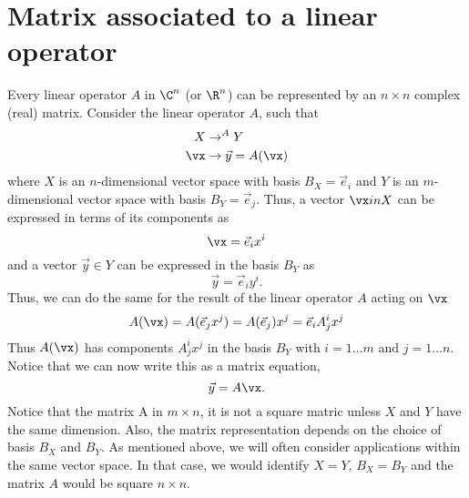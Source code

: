 \documentclass[cplx.tex]{subfiles}
\begin{document}
\section{Matrix associated to a linear operator}
Every linear operator $A$ in $\C^n$ (or $\R^n$) can be represented by an $n\times n$ complex (real) matrix. 
Consider the linear operator $A$, such that
\begin{align}
    X &\rightarrow^A Y \\
    \vx &\rightarrow \vec{y} = A(\vx)
\end{align}
where $X$ is an $n$-dimensional vector space with basis $B_X = \vec{e}_i$ and $Y$ is an $m$-dimensional vector space with basis $B_Y = \vec{e}_j$.
Thus, a vector $\vx in X$ can be expressed in terms of its components as 
\begin{equation}
    \vx = \vec{e}_ix^i
\end{equation}
and a vector $\vec{y} \in Y$ can be expressed in the basis $B_Y$ as 
\begin{equation}
    \vec{y} = \vec{e}_iy^i.
\end{equation}
Thus, we can do the same for the result of the linear operator $A$ acting on $\vx$
\begin{equation}
    A(\vx) = A(\vec{e}_jx^j) = A(\vec{e}_j)x^j = \vec{e}_iA^i_jx^j
\end{equation}
Thus $A(\vx)$ has components $A^i_jx^j$ in the basis $B_Y$ with $i=1\dots m$ and $j=1\dots n$. Notice that we can now write this as a matrix equation,
\begin{equation}
    \vec{y} = A\vx.
\end{equation}
Notice that the matrix A in $m\times n$, it is not a square matric unless $X$ and $Y$ have the same dimension. 
Also, the matrix representation depends on the choice of basis $B_X$ and $B_Y$.
As mentioned above, we will often consider applications within the same vector space. 
In that case, we would identify $X = Y$, $B_X = B_Y$ and the matrix $A$ would be square $n\times n$.
\end{document}

